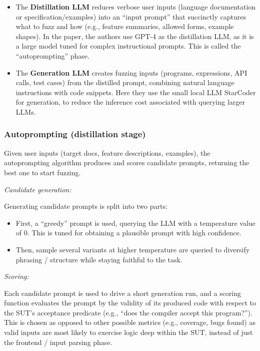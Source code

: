 \begin{itemize}
    \item The \textbf{Distillation LLM} reduces verbose user inputs (language documentation or specification/examples) into an ``input prompt'' that succinctly captures what to fuzz and how (e.g., feature summaries, allowed forms, example shapes). In the paper, the authors use GPT-4 as the distillation LLM, as it is a large model tuned for complex instructional prompts. This is called the ``autoprompting'' phase.
    \item The \textbf{Generation LLM} creates fuzzing inputs (programs, expressions, API calls, test cases) from the distilled prompt, combining natural language instructions with code snippets. Here they use the small local LLM StarCoder for generation, to reduce the inference cost associated with querying larger LLMs.
\end{itemize}

\subsubsection{Autoprompting (distillation stage)}

Given user inputs (target docs, feature descriptions, examples), the autoprompting algorithm produces and scores candidate prompts, returning the best one to start fuzzing.

\lilspace
\textit{Candidate generation:}

Generating candidate prompts is split into two parts:

\begin{itemize}
    \item First, a ``greedy'' prompt is used, querying the LLM with a temperature value of 0. This is tuned for obtaining a plausible prompt with high confidence.
    \item Then, sample several variants at higher temperature are queried to diversify phrasing / structure while staying faithful to the task.
\end{itemize}

\lilspace
\textit{Scoring:}

Each candidate prompt is used to drive a short generation run, and a scoring function evaluates the prompt by the validity of its produced code with respect to the SUT's acceptance predicate (e.g., ``does the compiler accept this program?''). This is chosen as opposed to other possible metrics (e.g., coverage, bugs found) as valid inputs are most likely to exercise logic deep within the SUT, instead of just the frontend / input parsing phase.

